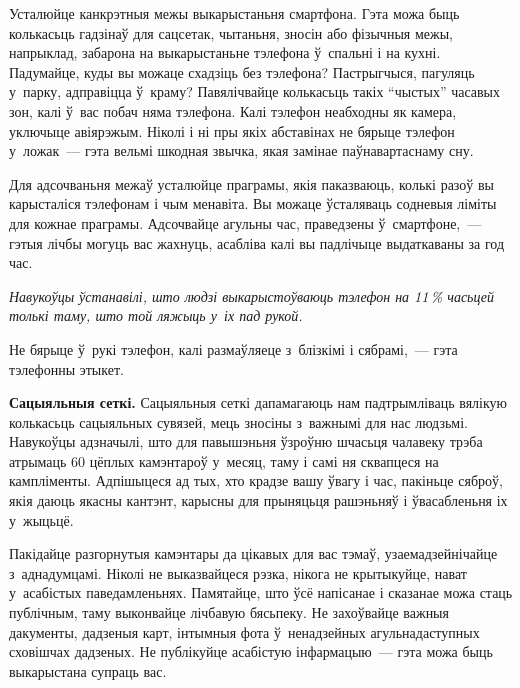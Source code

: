 Усталюйце канкрэтныя межы выкарыстаньня смартфона. Гэта можа быць колькасьць гадзінаў для сацсетак, чытаньня, зносін або фізычныя межы, напрыклад, забарона на выкарыстаньне тэлефона ў~спальні і на кухні. Падумайце, куды вы можаце схадзіць без тэлефона? Пастрыгчыся, пагуляць у~парку, адправіцца ў~краму? Павялічвайце колькасьць такіх ``чыстых'' часавых зон, калі ў~вас побач няма тэлефона. Калі тэлефон неабходны як камера, уключыце авіярэжым. Ніколі і ні пры якіх абставінах не бярыце тэлефон у~ложак~--- гэта вельмі шкодная звычка, якая замінае паўнавартаснаму сну.


Для адсочваньня межаў усталюйце праграмы, якія паказваюць, колькі разоў вы карысталіся тэлефонам і чым менавіта. Вы можаце ўсталяваць содневыя ліміты для кожнае праграмы. Адсочвайце агульны час, праведзены ў~смартфоне,~--- гэтыя лічбы могуць вас жахнуць, асабліва калі вы падлічыце выдаткаваны за год час.

\emph{Навукоўцы ўстанавілі, што людзі выкарыстоўваюць тэлефон на 11\,\% часьцей толькі таму, што той ляжыць у~іх пад рукой.}

Не бярыце ў~рукі тэлефон, калі размаўляеце з~блізкімі і сябрамі,~--- гэта тэлефонны этыкет.

\textbf{Сацыяльныя сеткі.} Сацыяльныя сеткі дапамагаюць нам падтрымліваць вялікую колькасьць сацыяльных сувязей, мець зносіны з~важнымі для нас людзьмі. Навукоўцы адзначылі, што для павышэньня ўзроўню шчасьця чалавеку трэба атрымаць 60 цёплых камэнтароў у~месяц, таму і самі ня сквапцеся на кампліменты. Адпішыцеся ад тых, хто крадзе вашу ўвагу і час, пакіньце сяброў, якія даюць якасны кантэнт, карысны для прыняцьця рашэньняў і ўвасабленьня іх у~жыцьцё.

Пакідайце разгорнутыя камэнтары да цікавых для вас тэмаў, узаемадзейнічайце з~аднадумцамі. Ніколі не выказвайцеся рэзка, нікога не крытыкуйце, нават у~асабістых паведамленьнях. Памятайце, што ўсё напісанае і сказанае можа стаць публічным, таму выконвайце лічбавую бясьпеку. Не захоўвайце важныя дакументы, дадзеныя карт, інтымныя фота ў~ненадзейных агульнадаступных сховішчах дадзеных. Не публікуйце асабістую інфармацыю~--- гэта можа быць выкарыстана супраць вас.

